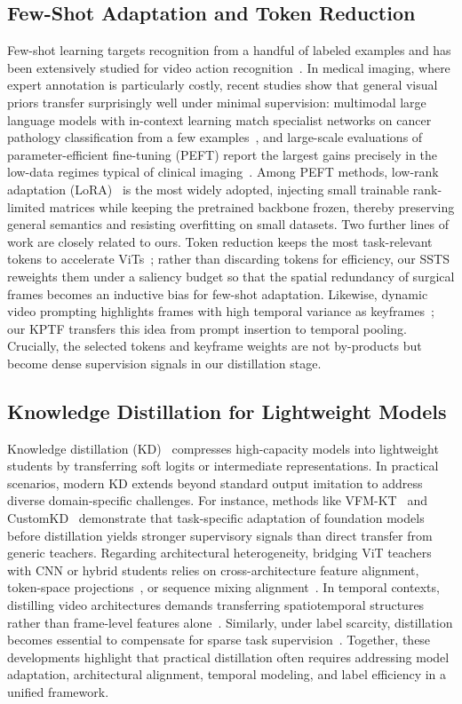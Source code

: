 \subsection{Few-Shot Adaptation and Token Reduction}
Few-shot learning targets recognition from a handful of labeled examples and has been extensively studied for video action recognition~\cite{wanyan2024comprehensive}. In medical imaging, where expert annotation is particularly costly, recent studies show that general visual priors transfer surprisingly well under minimal supervision: multimodal large language models with in-context learning match specialist networks on cancer pathology classification from a few examples~\cite{ferber2024incontext}, and large-scale evaluations of parameter-efficient fine-tuning (PEFT) report the largest gains precisely in the low-data regimes typical of clinical imaging~\cite{dutt2024missed}. Among PEFT methods, low-rank adaptation (LoRA)~\cite{hu2022lora} is the most widely adopted, injecting small trainable rank-limited matrices while keeping the pretrained backbone frozen, thereby preserving general semantics and resisting overfitting on small datasets. Two further lines of work are closely related to ours. Token reduction keeps the most task-relevant tokens to accelerate ViTs~\cite{bergner2025tokencropr}; rather than discarding tokens for efficiency, our SSTS reweights them under a saliency budget so that the spatial redundancy of surgical frames becomes an inductive bias for few-shot adaptation. Likewise, dynamic video prompting highlights frames with high temporal variance as keyframes~\cite{liu2025stop}; our KPTF transfers this idea from prompt insertion to temporal pooling. Crucially, the selected tokens and keyframe weights are not by-products but become dense supervision signals in our distillation stage.


\subsection{Knowledge Distillation for Lightweight Models}
Knowledge distillation (KD)~\cite{hinton2015distilling} compresses high-capacity models into lightweight students by transferring soft logits or intermediate representations. In practical scenarios, modern KD extends beyond standard output imitation to address diverse domain-specific challenges. For instance, methods like VFM-KT~\cite{vemulapalli2024knowledge} and CustomKD~\cite{lee2025customkd} demonstrate that task-specific adaptation of foundation models before distillation yields stronger supervisory signals than direct transfer from generic teachers. Regarding architectural heterogeneity, bridging ViT teachers with CNN or hybrid students relies on cross-architecture feature alignment, token-space projections~\cite{fan2024scalekd}, or sequence mixing alignment~\cite{liu2022cross}. In temporal contexts, distilling video architectures demands transferring spatiotemporal structures rather than frame-level features alone~\cite{pei2023clipping}. Similarly, under label scarcity, distillation becomes essential to compensate for sparse task supervision~\cite{hatano2024multimodal}. Together, these developments highlight that practical distillation often requires addressing model adaptation, architectural alignment, temporal modeling, and label efficiency in a unified framework.

